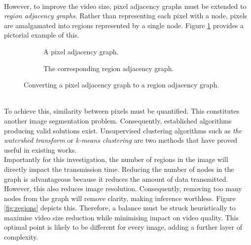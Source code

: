 \smallskip \\ \indent
However, to improve the video size, pixel adjacency graphs must be extended to \textit{region adjacency graphs}. Rather than representing each pixel with a node, pixels are amalgamated into regions represented by a single node. Figure \ref{fig:pixelToRegion} provides a pictorial example of this.
\begin{figure}[h!]
    \centering
    \begin{subfigure}[b]{0.49\textwidth}
        \centering
        \captionsetup{justification=centering}
        \scalebox{0.35}{}
        \caption{A pixel adjacency graph.}
    \end{subfigure}
    \hfill
    \begin{subfigure}[b]{0.49\textwidth}
        \centering
        \captionsetup{justification=centering}
        \scalebox{0.35}{}
        \caption{The corresponding region adjacency graph.}
    \end{subfigure}
    \caption[Pixel to Region Conversion]{Converting a pixel adjacency graph to a region adjacency graph.}
    \label{fig:pixelToRegion}
\end{figure}
\smallskip \\ \indent
To achieve this, similarity between pixels must be quantified. This constitutes another image segmentation problem. Consequently, established algorithms producing valid solutions exist. Unsupervised clustering algorithms such as \textit{the watershed transform} \cite{Watershed} or \textit{k-means clustering} \cite{KMeans} are two methods that have proved useful in existing works.
\smallskip \\ \indent
Importantly for this investigation, the number of regions in the image will directly impact the transmission time. Reducing the number of nodes in the graph is advantageous because it reduces the amount of data transmitted. However, this also reduces image resolution. Consequently, removing too many nodes from the graph will remove clarity, making inference worthless. Figure \ref{fig:regions} depicts this. Therefore, a balance must be struck heuristically to maximise video size reduction while minimising impact on video quality. This optimal point is likely to be different for every image, adding a further layer of complexity.
